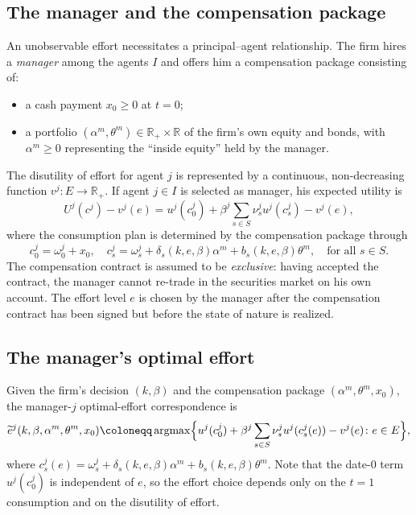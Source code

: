 \documentclass[11pt,a4paper,oneside]{book}
\def\R{\mathbb{R}}
\def\geq{\geqslant}
\DeclareMathOperator*{\argmax}{argmax}
\theoremstyle{plain}
\theoremstyle{definition}
\theoremstyle{remark}
\numberwithin{equation}{chapter}
\begin{document}
\subsection{The manager and the compensation package}

An unobservable effort necessitates a principal--agent relationship.
The firm hires a \emph{manager} among the agents $I$ and offers him a compensation package consisting of:
\begin{itemize}
  \item a cash payment $x_0 \geq 0$ at $t=0$;
  \item a portfolio $(\alpha^m, \theta^m) \in \R_+ \times \R$ of the firm's own equity and bonds, with $\alpha^m \geq 0$ representing the ``inside equity'' held by the manager.
\end{itemize}
The disutility of effort for agent $j$ is represented by a continuous, non-decreasing function $v^j : E \to \R_+$.
If agent $j \in I$ is selected as manager, his expected utility is
\begin{equation}\label{eq:manager-utility}
  U^j(c^j) - v^j(e) = u^j(c^j_0) + \beta^j \sum_{s \in S} \nu^j_s u^j(c^j_s) - v^j(e),
\end{equation}
where the consumption plan is determined by the compensation package through
\begin{equation}\label{eq:manager-consumption}
  c^j_0 = \omega^j_0 + x_0,
  \quad
  c^j_s = \omega^j_s + \delta_s(k, e, \beta) \alpha^m + b_s(k, e, \beta) \theta^m, \quad \text{for all $s\in S$}.
\end{equation}
The compensation contract is assumed to be \emph{exclusive}: having accepted the contract, the manager cannot re-trade in the securities market on his own account.
The effort level $e$ is chosen by the manager after the compensation contract has been signed but before the state of nature is realized.

\subsection{The manager's optimal effort}

Given the firm's decision $(k, \beta)$ and the compensation package $(\alpha^m, \theta^m, x_0)$, the manager-$j$ optimal-effort correspondence is
\begin{equation}\label{eq:opt-effort-MH-CPP}
  \widetilde{e}^j(k, \beta, \alpha^m, \theta^m, x_0)
  \coloneqq \argmax \Bigl\{ u^j(c^j_0) + \beta^j \sum_{s \in S} \nu^j_s u^j(c^j_s(e)) - v^j(e) \colon e \in E \Bigr\},
\end{equation}
where $c^j_s(e) = \omega^j_s + \delta_s(k, e, \beta) \alpha^m + b_s(k, e, \beta) \theta^m$.
Note that the date-$0$ term $u^j(c^j_0)$ is independent of $e$, so the effort choice depends only on the $t=1$ consumption and on the disutility of effort.
\end{document}
